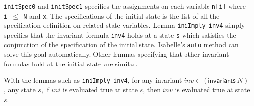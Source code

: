 \documentclass{llncs}
\begin{document}
{\tt initSpec0} and {\tt initSpec1} specifies the assignments on each variable {\tt n[i]} where {\tt i $\le$ N} and {\tt x}. The  specifications of the initial state is the list of all the specification definition on related state variables. Lemma {\tt iniImply\_inv4} simply specifies that the invariant formula {\tt inv4} holds at a state {\tt s} which satisfies the conjunction of the   specification of the initial state. Isabelle's {\tt auto} method can solve this goal automatically. Other lemmas specifying that other invariant formulas hold at the initial state are similar.

With the lemmas such as {\tt iniImply\_inv4}, for any invariant $inv \in (\mathsf{invariants} ~N) $,  any
state $s$, if $ini$ is evaluated true at state $s$, then $inv$ is
evaluated true at state $s$.
\end{document}
